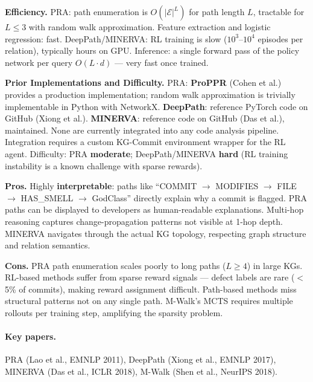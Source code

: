 \documentclass[12pt,a4paper]{article}
\begin{document}
\begin{effbox}
\textbf{Efficiency.}
PRA: path enumeration is $O(|\mathcal{E}|^L)$ for path length $L$, tractable
for $L \leq 3$ with random walk approximation. Feature extraction and logistic
regression: fast. DeepPath/MINERVA: RL training is slow ($10^3$--$10^4$
episodes per relation), typically hours on GPU. Inference: a single forward
pass of the policy network per query $O(L \cdot d)$ --- very fast once trained.
\end{effbox}

\begin{implbox}
\textbf{Prior Implementations and Difficulty.}
PRA: \textbf{ProPPR} (Cohen et al.) provides a production implementation;
random walk approximation is trivially implementable in Python with NetworkX.
\textbf{DeepPath}: reference PyTorch code on GitHub (Xiong et al.).
\textbf{MINERVA}: reference code on GitHub (Das et al.), maintained.
None are currently integrated into any code analysis pipeline. Integration
requires a custom KG-Commit environment wrapper for the RL agent.
Difficulty: PRA \textbf{moderate}; DeepPath/MINERVA \textbf{hard}
(RL training instability is a known challenge with sparse rewards).
\end{implbox}

\begin{prosbox}
\textbf{Pros.}
Highly \textbf{interpretable}: paths like ``COMMIT $\to$ MODIFIES $\to$ FILE
$\to$ HAS\_SMELL $\to$ GodClass'' directly explain why a commit is flagged.
PRA paths can be displayed to developers as human-readable explanations.
Multi-hop reasoning captures change-propagation patterns not visible at
1-hop depth. MINERVA navigates through the actual KG topology, respecting
graph structure and relation semantics.
\end{prosbox}

\begin{consbox}
\textbf{Cons.}
PRA path enumeration scales poorly to long paths ($L \geq 4$) in large KGs.
RL-based methods suffer from sparse reward signals --- defect labels are rare
($<$5\% of commits), making reward assignment difficult. Path-based methods
miss structural patterns not on any single path. M-Walk's MCTS requires
multiple rollouts per training step, amplifying the sparsity problem.
\end{consbox}

\paragraph{Key papers.} PRA (Lao et al., EMNLP 2011), DeepPath (Xiong et al.,
EMNLP 2017), MINERVA (Das et al., ICLR 2018), M-Walk (Shen et al., NeurIPS 2018).
\end{document}
